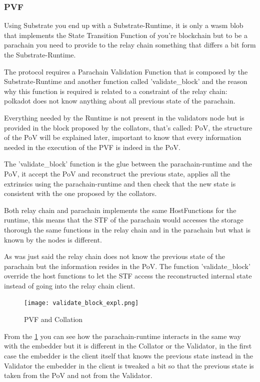 \documentclass[../main.tex]{subfiles}
\begin{document}
\subsubsection{PVF}

Using Substrate you end up with a Substrate-Runtime, it is only a wasm blob that implements the State Transition Function of you're blockchain but to be a parachain you need to provide to the relay chain something that differs a bit form the Substrate-Runtime.

The protocol requires a Parachain Validation Function that is composed by the Substrate-Runtime and another function called 'validate\_block' and the reason why this function is required is related to a constraint of the relay chain: polkadot does not know anything about all previous state of the parachain.

Everything needed by the Runtime is not present in the validators node but is provided in the block proposed by the collators, that's called: PoV, the structure of the PoV will be explained later, important to know that every information needed in the execution of the PVF is indeed in the PoV.

The 'validate\_block' function is the glue between the parachain-runtime and the PoV, it accept the PoV and reconstruct the previous state, applies all the extrinsics using the parachain-runtime and then check that the new state is consistent with the one proposed by the collators.

Both relay chain and parachain implements the same HostFunctions for the runtime, this means that the STF of the parachain would accesses the storage thorough the same functions in the relay chain and in the parachain but what is known by the nodes is different.

As was just said the relay chain does not know the previous state of the parachain but the information resides in the PoV. The function 'validate\_block' override the host functions to let the STF access the reconstructed internal state instead of going into the relay chain client.

\begin{figure}[h]
  \centering
  \texttt{[image: validate\_block\_expl.png]}
  \caption{PVF and Collation}
  \label{fig:pvf_pov}
\end{figure}


From the \ref{fig:pvf_pov} you can see how the parachain-runtime interacts in the same way with the embedder but it is different in the Collator or the Validator, in the first case the embedder is the client itself that knows the previous state instead in the Validator the embedder in the client is tweaked a bit so that the previous state is taken from the PoV and not from the Validator.
\end{document}
